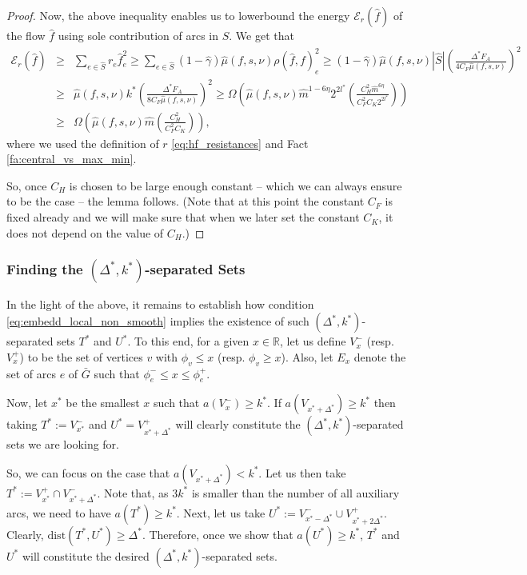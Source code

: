 \documentclass[11pt, letterpaper]{article}
\newcommand{\cheavy}{C_{H}}
\newcommand{\cfreeze}{C_{F}}
\newcommand{\ckstar}{C_{K}}
\newcommand{\fauxiliary}{F_{A}}
\newcommand{\bbR}{\mathbb{R}}
\newcommand{\oG}{\bar{G}}
\newcommand{\hm}{\widehat{m}}
\newcommand{\hS}{\hat{S}}
\newcommand{\energy}[2]{\mathcal{E}_{#1}(#2)}
\newcommand{\dist}[2]{\mathrm{dist}(#1,#2)}
\newcommand{\hf}{\hat{f}}
\newcommand{\hmu}{\hat{\mu}}
\newcommand{\hgamma}{\hat{\gamma}}
\newcommand{\vnu}{\boldsymbol{\mathit{\nu}}}
\renewcommand{\aa}{\boldsymbol{\mathit{a}}}
\newcommand{\ff}{\boldsymbol{\mathit{f}}}
\newcommand{\hff}{\boldsymbol{\mathit{\hat{f}}}}
\newcommand{\rr}{\boldsymbol{\mathit{r}}}
\renewcommand{\ss}{\boldsymbol{\mathit{s}}}
\begin{document}
\begin{proof}
Now, the above inequality enables us to lowerbound the energy $\energy{\rr}{\hff}$ of the flow $\hff$ using sole contribution of arcs in $\hS$. We get that \begin{eqnarray*}
\energy{\rr}{\hff} &\geq& \sum_{e\in \hS} r_e \hf_e^2 \geq \sum_{e\in \hS} (1-\hgamma) \hmu(\ff,\ss,\vnu) \rho(\hff,\ff)_e^2 \geq  (1-\hgamma) \hmu(\ff,\ss,\vnu) |\hS| \left(\frac{\Delta^* \fauxiliary}{4\cfreeze \hmu(\ff,\ss,\vnu)}\right)^2\\
&\geq & \hmu(\ff,\ss,\vnu) k^* \left(\frac{\Delta^* \fauxiliary}{8\cfreeze \hmu(\ff,\ss,\vnu)}\right)^2 \geq \Omega\left(\hmu(\ff,\ss,\vnu) \hm^{1-6\eta} 2^{2l^*} \left(\frac{\cheavy^2 \hm^{6\eta}}{\cfreeze^2\ckstar 2^{2l^*}}\right)\right)\\
& \geq & \Omega\left(\hmu(\ff,\ss,\vnu) \hm \left(\frac{\cheavy^2}{\cfreeze^2\ckstar}\right)\right),
\end{eqnarray*}
where we used the definition of $\rr$ \eqref{eq:hf_resistances} and Fact \ref{fa:central_vs_max_min}.

So, once $\cheavy$ is chosen to be large enough constant -- which we can always ensure to be the case -- the lemma follows. (Note that at this point the constant $\cfreeze$ is fixed already and we will make sure that when we later set the constant $\ckstar$, it does not depend on the value of $\cheavy$.) 
\end{proof}



\subsubsection*{Finding the $(\Delta^*,k^*)$-separated Sets}

In the light of the above, it remains to establish how condition \eqref{eq:embedd_local_non_smooth} implies the existence of such $(\Delta^*,k^*)$-separated sets $T^*$ and $U^*$.  To this end, for a given $x\in \bbR$, let us define $V_x^-$ (resp. $V_x^+$) to be the set of vertices $v$ with $\phi_v\leq x$ (resp. $\phi_v\geq x$). Also, let $E_x$ denote the set of arcs $e$ of $\oG$ such that $\phi_e^-\leq x \leq \phi_e^+$. 

Now, let $x^*$ be the smallest $x$ such that $\aa(V_x^-)\geq k^*$. If $\aa(V_{x^*+\Delta^*})\geq k^*$ then taking $T^*:=V_{x^*}^-$ and $U^*=V_{x^*+\Delta^*}^+$ will clearly constitute the $(\Delta^*,k^*)$-separated sets we are looking for. 

So, we can focus on the case that $\aa(V_{x^*+\Delta^*})< k^*$. Let us then take $T^*:=V_{x^*}^+\cap V_{x^*+\Delta^*}^-$. Note that, as $3k^*$ is smaller than the number of all auxiliary arcs, we need to have $\aa(T^*)\geq k^*$. Next, let us take $U^*:=V_{x^*-\Delta^*}^-\cup V_{x^*+2\Delta^*}^+$. Clearly, $\dist{T^*}{U^*}\geq \Delta^*$. Therefore, once we show that $\aa(U^*)\geq k^*$, $T^*$ and $U^*$ will constitute the desired $(\Delta^*,k^*)$-separated sets.
\end{document}
